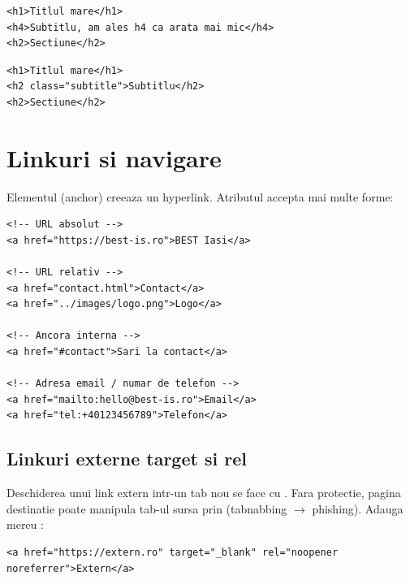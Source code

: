 \begin{dano}
\begin{lstlisting}[style=html, numbers=none]
<h1>Titlul mare</h1>
<h4>Subtitlu, am ales h4 ca arata mai mic</h4>
<h2>Sectiune</h2>
\end{lstlisting}
\end{dano}

\begin{dado}
\begin{lstlisting}[style=html, numbers=none]
<h1>Titlul mare</h1>
<h2 class="subtitle">Subtitlu</h2>
<h2>Sectiune</h2>
\end{lstlisting}
\end{dado}

\section{Linkuri si navigare}

Elementul  (anchor) creeaza un hyperlink. Atributul  accepta mai multe forme:

\begin{lstlisting}[style=html, caption={Tipuri de URL-uri}]
<!-- URL absolut -->
<a href="https://best-is.ro">BEST Iasi</a>

<!-- URL relativ -->
<a href="contact.html">Contact</a>
<a href="../images/logo.png">Logo</a>

<!-- Ancora interna -->
<a href="#contact">Sari la contact</a>

<!-- Adresa email / numar de telefon -->
<a href="mailto:hello@best-is.ro">Email</a>
<a href="tel:+40123456789">Telefon</a>
\end{lstlisting}

\subsection{Linkuri externe \textendash{} target si rel}

Deschiderea unui link extern intr-un tab nou se face cu . Fara protectie, pagina destinatie poate manipula tab-ul sursa prin  (tabnabbing $\to$ phishing). Adauga mereu :

\begin{lstlisting}[style=html, numbers=none]
<a href="https://extern.ro" target="_blank" rel="noopener noreferrer">Extern</a>
\end{lstlisting}

